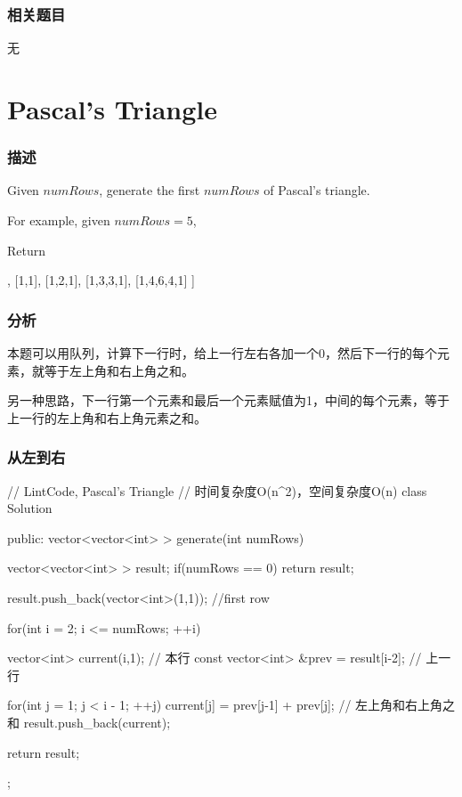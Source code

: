 \subsubsection{相关题目}

\begindot
\item 无
\myenddot


\section{Pascal's Triangle} %
\label{sec:pascals-triangle}


\subsubsection{描述}
Given $numRows$, generate the first $numRows$ of Pascal's triangle.

For example, given $numRows = 5$,

Return
\begin{Code}
[
     [1],
    [1,1],
   [1,2,1],
  [1,3,3,1],
 [1,4,6,4,1]
]
\end{Code}


\subsubsection{分析}
本题可以用队列，计算下一行时，给上一行左右各加一个0，然后下一行的每个元素，就等于左上角和右上角之和。

另一种思路，下一行第一个元素和最后一个元素赋值为1，中间的每个元素，等于上一行的左上角和右上角元素之和。


\subsubsection{从左到右}
\begin{Code}
// LintCode, Pascal's Triangle
// 时间复杂度O(n^2)，空间复杂度O(n)
class Solution {
public:
    vector<vector<int> > generate(int numRows) {
        vector<vector<int> > result;
        if(numRows == 0) return result;

        result.push_back(vector<int>(1,1)); //first row

        for(int i = 2; i <= numRows; ++i) {
            vector<int> current(i,1);  // 本行
            const vector<int> &prev = result[i-2];  // 上一行

            for(int j = 1; j < i - 1; ++j) {
                current[j] = prev[j-1] + prev[j]; // 左上角和右上角之和
            }
            result.push_back(current);
        }
        return result;
    }
};
\end{Code}


